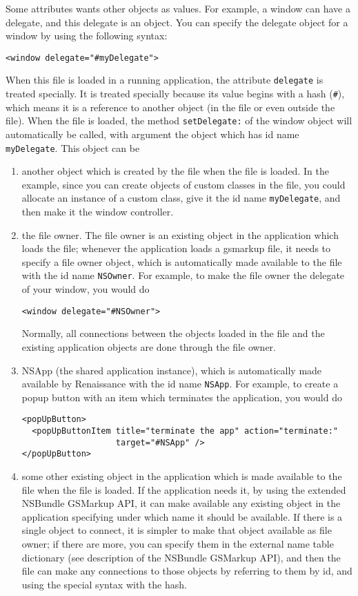 Some attributes wants other objects as values.  For example, a window
can have a delegate, and this delegate is an object.  You can specify
the delegate object for a window by using the following syntax:
\begin{verbatim}
<window delegate="#myDelegate">
\end{verbatim}
When this file is loaded in a running application, the attribute 
\texttt{delegate} is treated specially.  It is treated specially because
its value begins with a hash (\texttt{\#}), which means it is a
reference to another object (in the file or even outside the file).
When the file is loaded, the method \texttt{setDelegate:} of the
window object will automatically be called, with argument the object
which has id name \texttt{myDelegate}.  This object can be 
\begin{enumerate}
\item another object which is created by the file when the file is
  loaded.  In the example, since you can create objects of custom
  classes in the file, you could allocate an instance of a custom
  class, give it the id name \texttt{myDelegate}, and then make it the
  window controller.

\item the file owner.  The file owner is an existing object in the
  application which loads the file; whenever the application loads a
  gsmarkup file, it needs to specify a file owner object, which is
  automatically made available to the file with the id name
  \texttt{NSOwner}.  For example, to make the file owner the delegate
  of your window, you would do
\begin{verbatim}
<window delegate="#NSOwner">
\end{verbatim}
  Normally, all connections between the objects loaded in the file and
  the existing application objects are done through the file owner.

\item NSApp (the shared application instance), which is automatically
  made available by Renaissance with the id name \texttt{NSApp}.  For
  example, to create a popup button with an item which terminates the
  application, you would do
\begin{verbatim}
<popUpButton>
  <popUpButtonItem title="terminate the app" action="terminate:"
                   target="#NSApp" />
</popUpButton>
\end{verbatim}

\item some other existing object in the application which is made
  available to the file when the file is loaded.  If the application
  needs it, by using the extended NSBundle GSMarkup API, it can make
  available any existing object in the application specifying under
  which name it should be available.  If there is a single object to
  connect, it is simpler to make that object available as file owner;
  if there are more, you can specify them in the external name table
  dictionary (see description of the NSBundle GSMarkup API), and then
  the file can make any connections to those objects by referring to
  them by id, and using the special syntax with the hash.

\end{enumerate}

